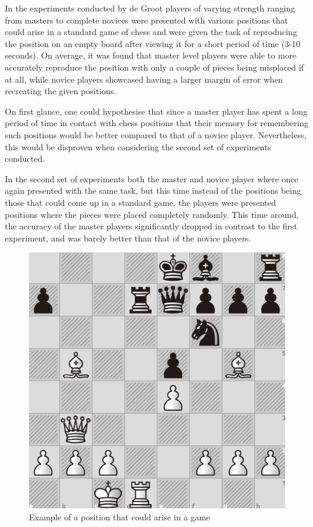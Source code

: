 In the experiments conducted by de Groot \cite{deGroot} players of varying strength ranging from masters to complete novices were presented with various positions that could arise in a standard game of chess and were given the task of reproducing the position on an empty board after viewing it for a short period of time (3-10 seconds). On average, it was found that master level players were able to more accurately reproduce the position with only a couple of pieces being misplaced if at all, while novice players showcased having a larger margin of error when recreating the given positions.

On first glance, one could hypothesise that since a master player has spent a long period of time in contact with chess positions that their memory for remembering such positions would be better compared to that of a novice player. Nevertheless, this would be disproven when considering the second set of experiments conducted.

In the second set of experiments both the master and novice player where once again presented with the same task, but this time instead of the positions being those that could come up in a standard game, the players were presented positions where the pieces were placed completely randomly. This time around, the accuracy of the master players significantly dropped in contrast to the first experiment, and was barely better than that of the novice players.

\begin{figure}[H]
    \centering
    \includegraphics[scale=0.45]{images/MorphyPosition.png}
    \caption{Example of a position that could arise in a game}
    \label{MorphyPosition}
\end{figure}


